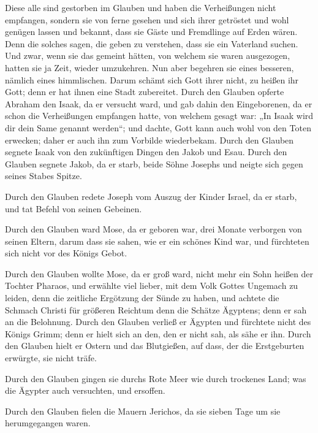  Diese alle sind gestorben im Glauben und haben die
Verheißungen nicht empfangen, sondern sie von ferne gesehen und sich
ihrer getröstet und wohl genügen lassen und bekannt, dass sie Gäste und
Fremdlinge auf Erden wären.  Denn die solches sagen, die
geben zu verstehen, dass sie ein Vaterland suchen.  Und
zwar, wenn sie das gemeint hätten, von welchem sie waren ausgezogen,
hatten sie ja Zeit, wieder umzukehren.  Nun aber begehren
sie eines besseren, nämlich eines himmlischen. Darum schämt sich Gott
ihrer nicht, zu heißen ihr Gott; denn er hat ihnen eine Stadt
zubereitet.  Durch den Glauben opferte Abraham den Isaak,
da er versucht ward, und gab dahin den Eingeborenen, da er schon die
Verheißungen empfangen hatte,  von welchem gesagt war:
„In Isaak wird dir dein Same genannt werden``;  und
dachte, Gott kann auch wohl von den Toten erwecken; daher er auch ihn
zum Vorbilde wiederbekam.  Durch den Glauben segnete
Isaak von den zukünftigen Dingen den Jakob und Esau. 
Durch den Glauben segnete Jakob, da er starb, beide Söhne Josephs und
neigte sich gegen seines Stabes Spitze.

 Durch den Glauben redete Joseph vom Auszug der Kinder
Israel, da er starb, und tat Befehl von seinen Gebeinen.

 Durch den Glauben ward Mose, da er geboren war, drei
Monate verborgen von seinen Eltern, darum dass sie sahen, wie er ein
schönes Kind war, und fürchteten sich nicht vor des Königs Gebot.

 Durch den Glauben wollte Mose, da er groß ward, nicht
mehr ein Sohn heißen der Tochter Pharaos,  und erwählte
viel lieber, mit dem Volk Gottes Ungemach zu leiden, denn die zeitliche
Ergötzung der Sünde zu haben,  und achtete die Schmach
Christi für größeren Reichtum denn die Schätze Ägyptens; denn er sah an
die Belohnung.  Durch den Glauben verließ er Ägypten und
fürchtete nicht des Königs Grimm; denn er hielt sich an den, den er
nicht sah, als sähe er ihn.  Durch den Glauben hielt er
Ostern und das Blutgießen, auf dass, der die Erstgeburten erwürgte, sie
nicht träfe.

 Durch den Glauben gingen sie durchs Rote Meer wie durch
trockenes Land; was die Ägypter auch versuchten, und ersoffen.

 Durch den Glauben fielen die Mauern Jerichos, da sie
sieben Tage um sie herumgegangen waren.

